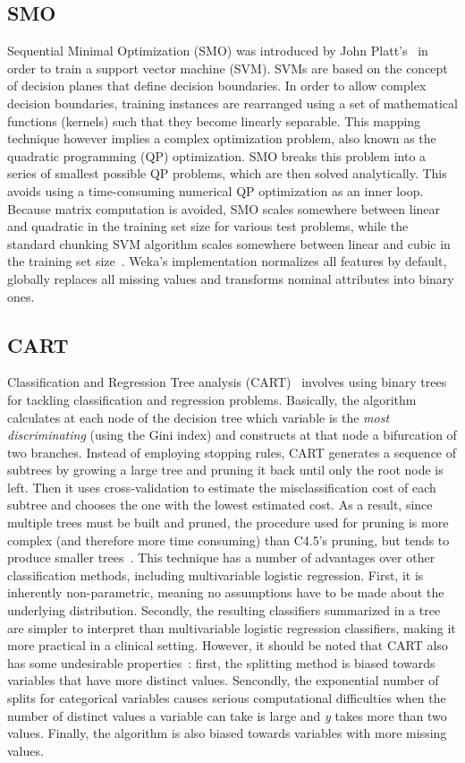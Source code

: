 \subsection{SMO}
Sequential Minimal Optimization (SMO) was introduced by John Platt's~\cite{Platt98machines} in order to train a support vector machine (SVM). SVMs are based on the concept of decision planes that define decision boundaries. In order to allow complex decision boundaries, training instances are rearranged using a set of mathematical functions (kernels) such that they become linearly separable. This mapping technique however implies a complex optimization problem, also known as the quadratic programming (QP) optimization.  SMO breaks this problem into a series of smallest possible QP problems, which are then solved analytically. This avoids using a time-consuming numerical QP optimization as an inner loop. Because matrix computation is avoided, SMO scales somewhere between linear and quadratic in the training set size for various test problems, while the standard chunking SVM algorithm scales somewhere between linear and cubic in the training set size~\cite{Platt98smo}. Weka's implementation normalizes all features by default, globally replaces all missing values and transforms nominal attributes into binary ones.

\subsection{CART}
Classification and Regression Tree analysis (CART)~\cite{Bk1871082462} involves using binary trees for tackling classification and regression problems. Basically, the algorithm calculates at each node of the decision tree which variable is the \textit{most discriminating} (using the Gini index) and constructs at that node a bifurcation of two branches. Instead of employing stopping rules, CART generates a sequence of subtrees by growing a large tree and pruning it back until only the root node is left. Then it uses cross-validation to estimate the misclassification cost of each subtree and chooses the one with the lowest estimated cost. As a result, since multiple trees must be built and pruned, the procedure used for pruning is more complex (and therefore more time consuming) than C4.5's pruning, but tends to produce smaller trees~\cite{oatesJensen97}. This technique has a number of advantages over other classification methods, including multivariable logistic regression. First, it is inherently non-parametric, meaning no assumptions have to be made about the underlying distribution. Secondly, the resulting classifiers summarized in a tree are simpler to interpret than multivariable logistic regression classifiers, making it more practical in a clinical setting. However, it should be noted that CART also has some undesirable properties~\cite{cartLoh}: first, the splitting method is biased towards variables that have more distinct values. Sencondly, the exponential number of splits for categorical variables causes serious computational difficulties when the number of distinct values a variable can take is large and \textit{y} takes more than two values. Finally, the algorithm is also biased towards variables with more missing values.

